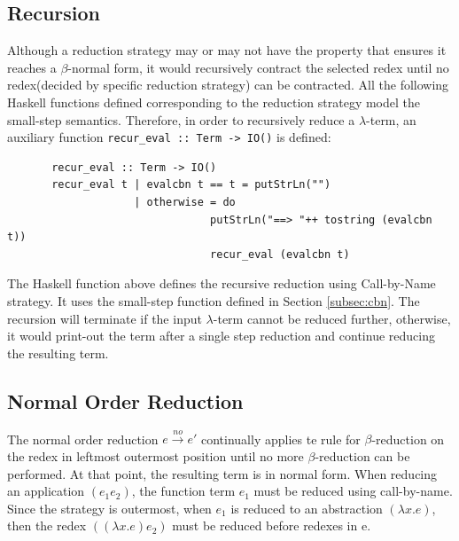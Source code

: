 \subsection*{Recursion}

Although a reduction strategy may or may not have the property that ensures it reaches a $\beta$-normal form, it would recursively contract the selected redex until no redex(decided by specific reduction strategy) can be contracted. All the following Haskell functions defined corresponding to the reduction strategy model the small-step semantics. Therefore, in order to recursively reduce a $\lambda$-term, an auxiliary function \verb|recur_eval :: Term -> IO()| is defined:

\begin{verbatim}
       recur_eval :: Term -> IO()
       recur_eval t | evalcbn t == t = putStrLn("")
                    | otherwise = do
                                putStrLn("==> "++ tostring (evalcbn t))
                                recur_eval (evalcbn t)
\end{verbatim}

The Haskell function above defines the recursive reduction using Call-by-Name strategy. It uses the small-step function defined in Section \ref{subsec:cbn}. The recursion will terminate if the input $\lambda$-term cannot be reduced further, otherwise, it would print-out the term after a single step reduction and continue reducing the resulting term.



\subsection{Normal Order Reduction}{\label{subsec:normal}}

The normal order reduction $e\xrightarrow{no} e'$ continually applies te rule for $\beta$-reduction on the redex in leftmost outermost position until no more $\beta$-reduction can be performed. At that point, the resulting term is in normal form. When reducing an application $(e_1e_2)$, the function term $e_1$ must be reduced using call-by-name. Since the strategy is outermost, when $e_1$ is reduced to an abstraction $(\lambda x.e)$, then the redex $((\lambda x.e)e_2)$ must be reduced before redexes in e.

